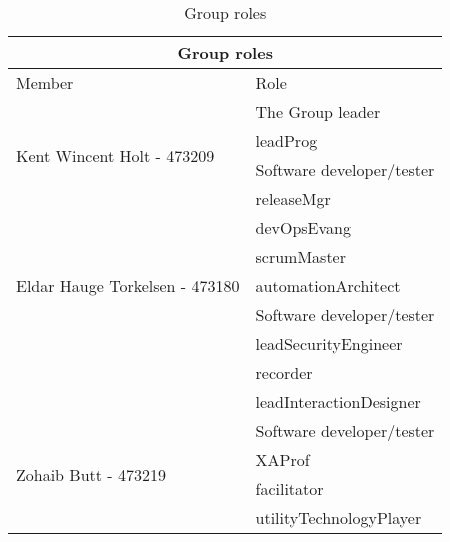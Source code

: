 \begin{table}[H]
\centering
\begin{tabular}{|l|l|}
\hline
\multicolumn{2}{|c|}{ \cellcolor[HTML]{AFAFAF} Group roles} \\
\hline
    \cellcolor[HTML]{AFAFAF} Member & \cellcolor[HTML]{AFAFAF} Role \\
\hline
\multirow{4}{*}{Kent Wincent Holt - 473209} 
 & The Group leader \\
 & \gls{leadProg} \\
 & Software developer/tester \\
 & \gls{releaseMgr} \\

\hline
\multirow{5}{*}{Eldar Hauge Torkelsen - 473180} 
 & \gls{devOpsEvang} \\
 & \gls{scrumMaster} \\
 & \gls{automationArchitect} \\ 
 & Software developer/tester \\
 & \gls{leadSecurityEngineer} \\
 & \gls{recorder} \\
 & \gls{leadInteractionDesigner} \\
 
\hline
\multirow{4}{*}{Zohaib Butt - 473219 } 
 & Software developer/tester \\
 & \gls{XAProf} \\
 & \gls{facilitator} \\
 & \gls{utilityTechnologyPlayer} \\
\hline
\end{tabular}
\caption{Group roles}
\end{table}